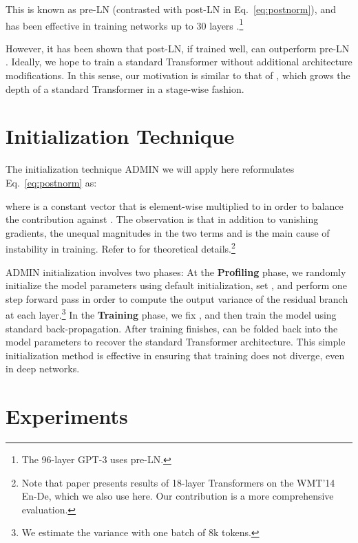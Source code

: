 \documentclass[11pt,a4paper]{article}
\begin{document}
This is known as pre-LN (contrasted with post-LN in Eq.~\ref{eq:postnorm}), and has been effective in training networks up to 30 layers \cite{wang2019preln}.\footnote{The 96-layer GPT-3 \cite{brown2020gpt3} uses pre-LN.}

However, it has been shown that post-LN, if trained well, can outperform pre-LN \cite{liu2020deeptransformer}. 
Ideally, we hope to train a standard Transformer without additional architecture modifications. 
In this sense, our motivation is similar to that of \citet{wu2019depth}, which grows the depth of a standard Transformer in a stage-wise fashion.
 \section{Initialization Technique}
\label{sec:dnmt}

The initialization technique ADMIN \cite{liu2020deeptransformer} we will apply here reformulates Eq.~\ref{eq:postnorm} as:
\vspace{-2mm}

where  is a constant vector that is element-wise multiplied to  in order to balance the contribution against . 
The observation is that in addition to vanishing gradients, the unequal magnitudes in the two terms 
 and  is the main cause of instability in training.
Refer to \cite{liu2020deeptransformer} for theoretical details.\footnote{Note that paper presents results of 18-layer Transformers on the WMT'14 En-De, which we also use here. Our contribution is a more comprehensive evaluation.} 

ADMIN initialization involves two phases:
At the {\bf Profiling} phase, we randomly initialize the model parameters using default initialization, set , and perform one step forward pass in order to compute the output variance of the residual branch  at each layer.\footnote{We estimate the variance with one batch of 8k tokens.} In the {\bf Training} phase, we fix , and then train the model using standard back-propagation. 
After training finishes,  can be folded back into the model parameters to recover the standard Transformer architecture. 
This simple initialization method is effective in ensuring that training does not diverge, even in deep networks.  \section{Experiments}
\label{sec:exp}
\end{document}
